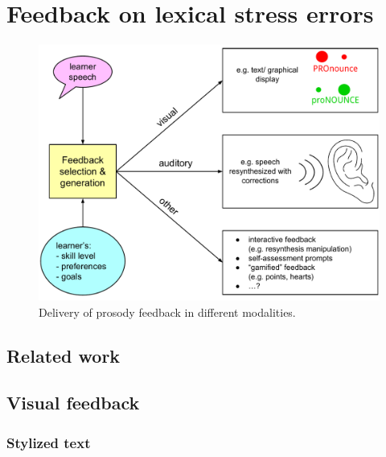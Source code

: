 %
%
\chapter{Feedback on lexical stress errors}
\label{chap:feedback}


 

\begin{figure}[htb]
		\includegraphics[width=\textwidth]{../img/feedback}
		\caption{Delivery of prosody feedback in different modalities.}
		\label{fig:feedback}
	\end{figure}

\section{Related work}
\label{sec:fb:related}

	\cite{Sitaram2011}
	\cite{Bonneau2011}
	\citep{Hattie2007}
	

\section{Visual feedback}
\label{sec:fb:visual}

	\subsection{Stylized text}
	\label{sec:visual:text}
	
